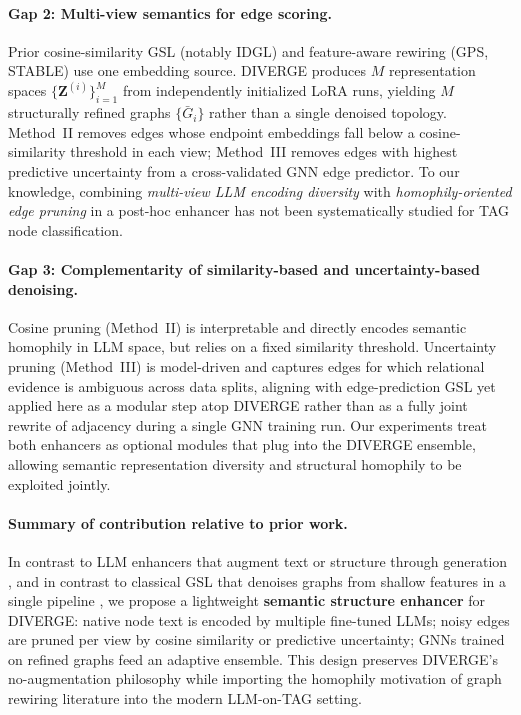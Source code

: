 \documentclass{article}
\begin{document}
\paragraph{Gap 2: Multi-view semantics for edge scoring.}
Prior cosine-similarity GSL (notably IDGL) and feature-aware rewiring (GPS, STABLE)
use one embedding source. DIVERGE produces $M$ representation spaces
$\{\mathbf{Z}^{(i)}\}_{i=1}^{M}$ from independently initialized LoRA runs, yielding
$M$ structurally refined graphs $\{\bar{G}_i\}$ rather than a single denoised topology.
Method~II removes edges whose endpoint embeddings fall below a cosine-similarity
threshold in each view; Method~III removes edges with highest predictive uncertainty
from a cross-validated GNN edge predictor. To our knowledge, combining \emph{multi-view
LLM encoding diversity} with \emph{homophily-oriented edge pruning} in a post-hoc
enhancer has not been systematically studied for TAG node classification.

\paragraph{Gap 3: Complementarity of similarity-based and uncertainty-based denoising.}
Cosine pruning (Method~II) is interpretable and directly encodes semantic homophily in
LLM space, but relies on a fixed similarity threshold. Uncertainty pruning (Method~III)
is model-driven and captures edges for which relational evidence is ambiguous across
data splits, aligning with edge-prediction GSL \citep{yu2020grcn,zhao2021gaug} yet
applied here as a modular step atop DIVERGE rather than as a fully joint rewrite of
adjacency during a single GNN training run. Our experiments treat both enhancers as
optional modules that plug into the DIVERGE ensemble, allowing semantic representation
diversity and structural homophily to be exploited jointly.

\paragraph{Summary of contribution relative to prior work.}
In contrast to LLM enhancers that augment text or structure through generation
\citep{he2024harnessing,Sun2026TopologicalEnhancerTAG,guo2024graphedit,zhang2025leveraging},
and in contrast to classical GSL that denoises graphs from shallow features in a
single pipeline \citep{jin2020prognn,chen2020idgl,luo2021ptdnet,dong2023gps}, we
propose a lightweight \textbf{semantic structure enhancer} for DIVERGE: native node
text is encoded by multiple fine-tuned LLMs; noisy edges are pruned per view by
cosine similarity or predictive uncertainty; GNNs trained on refined graphs feed an
adaptive ensemble. This design preserves DIVERGE's no-augmentation philosophy while
importing the homophily motivation of graph rewiring literature into the modern
LLM-on-TAG setting.
\end{document}
